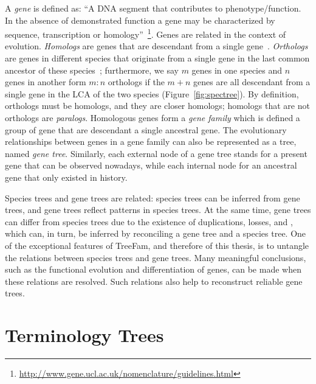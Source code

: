 A \emph{gene} is defined as: ``A DNA segment that contributes to phenotype/function. In
the absence of demonstrated function a gene may be characterized by sequence, transcription or
homology''~\footnote{\href{http://www.gene.ucl.ac.uk/nomenclature/guidelines.html}
{http://www.gene.ucl.ac.uk/nomenclature/guidelines.html}}.
Genes are related in the context of evolution. {\it Homologs} are genes
that are descendant from a single gene~\cite{koonin05}. {\it Orthologs} are genes in different
species that originate from a single gene in the last common ancestor of these species~\cite{remm01}; furthermore,
we say $m$ genes in one species and $n$ genes in another form $m:n$ orthologs if
the $m+n$ genes are all descendant from a single gene in the LCA of the two species (Figure~\ref{fig:spectree}).
By definition, orthologs must be homologs, and they are closer homologs;
homologs that are not orthologs are {\it paralogs}.
Homologous genes form a \emph{gene family} which
is defined a group of gene that are descendant  a single ancestral gene. The evolutionary relationships
between genes in a gene family can also be represented as a tree, named \emph{gene tree}.
Similarly, each external node of a gene tree stands for a present gene that
can be observed nowadays, while each internal node for an ancestral gene that
only existed in history.

Species trees and gene trees are related: species trees can be inferred from gene trees, and
gene trees reflect patterns in species trees. At the same time, gene trees can differ from
species trees due to the existence of duplications, losses, and
, which can, in turn, be inferred by reconciling
a gene tree and a species tree. One of the exceptional features of TreeFam, and therefore
of this thesis, is to untangle the relations between species trees and gene trees.
Many meaningful conclusions, such as the functional evolution and differentiation of genes,
can be made when these relations are resolved. Such relations also help to reconstruct reliable gene trees.


\section{Terminology  Trees}

